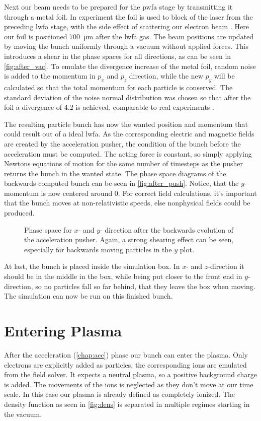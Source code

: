 \documentclass[bachelor_thesis]{subfiles}
\begin{document}
Next our beam needs to be prepared for the \gls{pwfa} stage by transmitting it through a metal foil. In experiment the foil is used to block of the laser from the preceding \gls{lwfa} stage, 
with the side effect of scattering our electron beam \cite{Raj2020}. Here our foil is positioned \qty{700}{\um} after the \gls{lwfa} gas.
The beam positions are updated by moving the bunch uniformly through a vacuum without applied forces. This introduces a shear in the phase spaces for all directions, as can be seen in \autoref{fig:after_vac}.
To emulate the divergence increase of the metal foil, random noise is added to the momentum in $p_x$ and $p_z$ direction, while the new $p_y$ will be calculated so that the total momentum for each particle is conserved.
The standard deviation of the noise normal distribution was chosen so that after the foil a divergence of \qty{4.2}{\mrad} is achieved, comparable to real experiments \cite{Schoebel2022}.

The resulting particle bunch has now the wanted position and momentum that could result out of a ideal \gls{lwfa}. As the corresponding  electric and magnetic fields are created by the acceleration pusher,
the condition of the bunch before the acceleration must be computed. The acting force is constant, so simply applying Newtons equations of motion for the same number of timesteps as the pusher returns the bunch in the wanted state.
The phase space diagrams of the backwards computed bunch can be seen in \autoref {fig:after_push}. Notice, that the $y$-momentum is now centered around \num{0}. For correct field calculations, it's important that the bunch moves at non-relativistic speeds,
else nonphysical fields could be produced.

\begin{figure}
	\missingfigure{}
	\caption{Phase space for $x$- and $y$- direction after the backwards evolution of the acceleration pusher. Again, a strong shearing effect can be seen, especially for backwards moving particles in the $y$ plot.}
	\label{fig:after_push}
\end{figure}

At last, the bunch is placed inside the simulation box. In $x$- and $z$-direction it should be in the middle in the box, while being put closer to the front end in $y$-direction, so no particles fall so far behind, that they leave the box when moving.
The simulation can now be run on this finished bunch.

\section{Entering Plasma}\label{chap:plasma}
 After the acceleration (\autoref{chap:acc}) phase our bunch can enter the plasma.
Only electrons are explicitly added as particles, the corresponding ions are emulated from the field solver. It expects a neutral plasma, so a positive background charge is added. 
The movements of the ions is neglected as they don't move at our time scale. In this case our plasma is already defined as completely ionized.
The density function as seen in \autoref{fig:dens} is separated in multiple regimes starting in the vacuum. 
\end{document}
